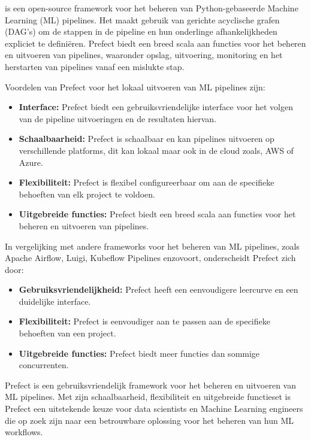 \textcite{Prefect2024} is een open-source framework voor het beheren van Python-gebaseerde Machine Learning (ML) pipelines. Het maakt gebruik van gerichte acyclische grafen (DAG's) om de stappen in de pipeline en hun onderlinge afhankelijkheden expliciet te definiëren. Prefect biedt een breed scala aan functies voor het beheren en uitvoeren van pipelines, waaronder opslag, uitvoering, monitoring en het herstarten van pipelines vanaf een mislukte stap.

Voordelen van Prefect voor het lokaal uitvoeren van ML pipelines zijn:

\begin{itemize}
  \item \textbf{Interface:} Prefect biedt een gebruiksvriendelijke interface voor het volgen van de pipeline uitvoeringen en de resultaten hiervan.
  \item \textbf{Schaalbaarheid:} Prefect is schaalbaar en kan pipelines uitvoeren op verschillende platforms, dit kan lokaal maar ook in de cloud zoals, AWS of Azure.
  \item \textbf{Flexibiliteit:} Prefect is flexibel configureerbaar om aan de specifieke behoeften van elk project te voldoen.
  \item \textbf{Uitgebreide functies:} Prefect biedt een breed scala aan functies voor het beheren en uitvoeren van pipelines.
\end{itemize}

In vergelijking met andere frameworks voor het beheren van ML pipelines, zoals Apache Airflow, Luigi, Kubeflow Pipelines enzovoort, onderscheidt Prefect zich door:

\begin{itemize}
  \item \textbf{Gebruiksvriendelijkheid:} Prefect heeft een eenvoudigere leercurve en een duidelijke interface.
  \item \textbf{Flexibiliteit:} Prefect is eenvoudiger aan te passen aan de specifieke behoeften van een project.
  \item \textbf{Uitgebreide functies:} Prefect biedt meer functies dan sommige concurrenten.
\end{itemize}
Prefect is een gebruiksvriendelijk framework voor het beheren en uitvoeren van ML pipelines. Met zijn schaalbaarheid, flexibiliteit en uitgebreide functieset is Prefect een uitstekende keuze voor data scientists en Machine Learning engineers die op zoek zijn naar een betrouwbare oplossing voor het beheren van hun ML workflows.

